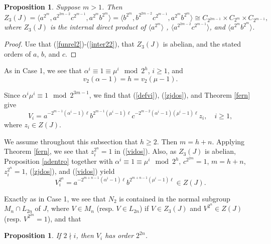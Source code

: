 \documentclass{amsart}
\newtheorem{prop}[theorem]{Proposition}
\theoremstyle{definition}
\theoremstyle{remark}
\begin{document}
{\begin{prop}\label{muevoandrea} Suppose $m>1$. Then
$$
Z_3(J)=\langle a^{2^{m}}, a^{2^{2m-2}}c^{2^{m-1}}, a^{2^{m}}b^{2^{m}}\rangle=
\langle b^{2^{m}}, b^{2^{2m-2}}c^{2^{m-1}}, a^{2^{m}}b^{2^{m}}\rangle
\cong C_{2^{2m-1}}\times  C_{2^{m}}\times C_{2^{m-1}},
$$
where $Z_3(J)$ is the internal direct product of $\langle a^{2^{m}}\rangle$ , $\langle a^{2^{2m-2}}c^{2^{m-1}}\rangle$, 
and $\langle a^{2^{m}}b^{2^{m}}\rangle$.
\end{prop}

\begin{proof} Use that (\ref{funrel2})-(\ref{inter22}), that $Z_3(J)$ is abelian, and the stated orders of $a$, $b$, and $c$.
\end{proof}

As in Case 1, we see that $\alpha^i\equiv 1\equiv \mu^i\mod 2^h$, $i\geq 1$, and  
\begin{equation}
\label{evvv}
v_2(\alpha-1)=h=v_2(\mu-1).
\end{equation}

Since $\alpha^i\mu^i\equiv 1\mod 2^{3m-1}$, we find that (\ref{defvi}), (\ref{zjdos}), and Theorem \ref{fern} give
\begin{equation}
\label{vidos}
V_i=a^{-2^{m-1}(\alpha^i-1)\ell} b^{2^{m-1}(\mu^i-1)\ell} c^{-2^{m-2}(\alpha^i-1)(\mu^i-1)\ell} z_i,\quad i\geq 1,
\end{equation}
where $z_i\in Z(J)$.

\medskip

 We assume throughout this subsection that $h\geq 2$. Then $m=h+n$.
Applying Theorem \ref{fern}, we see that $z_i^{2^n}=1$ in (\ref{vidos}). Also,
as $Z_3(J)$ is abelian, Proposition \ref{adentro} together with 
$\alpha^i\equiv 1\equiv\mu^i\mod 2^h$, $c^{2^{2m}}=1$, $m=h+n$, $z_i^{2^n}=1$,
(\ref{zjdos}), and (\ref{vidos}) yield
\begin{equation}
\label{vipdos}
V_i^{2^n}=a^{-2^{m+n-1}(\alpha^i-1)\ell} b^{2^{m+n-1}(\mu^i-1)\ell}\in Z(J).
\end{equation}

Exactly as in Case 1, we see that $N_2$
is contained in the normal subgroup $M_{n}\cap L_{2n}$ of $J$, where $V\in M_n$ (resp. $V\in L_{2n}$)
if $V\in Z_3(J)$ and $V^{2^{n}}\in Z(J)$ (resp. $V^{2^{2n}}=1$), and that

\begin{prop}\label{v2ndos} If $2\nmid i$, then $V_i$ has order $2^{2n}$.
\end{prop}





}
\end{document}
